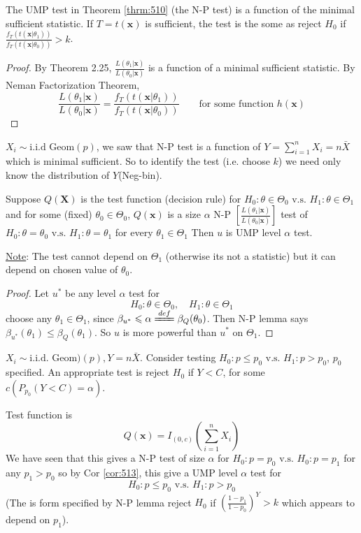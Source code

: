 \documentclass[english, 11pt]{article}
\begin{document}
\begin{cor}\label{cor:512}
The UMP test in Theorem \ref{thrm:510} (the N-P test) is a function of the minimal sufficient statistic. If $T=t(\bm{x})$ is sufficient, the test is the some as reject $H_0$ if $\frac{f_T(t(\bm{x}|\theta_1))}{f_T(t(\bm{x}|\theta_0))}>k$.
\end{cor}
\begin{proof}
By Theorem 2.25, $\frac{L(\theta_1|\bm{x})}{L(\theta_0|\bm{x})}$ is a function of a minimal sufficient statistic. By Neman Factorization Theorem,
$$
\frac{L(\theta_1|\bm{x})}{L(\theta_0|\bm{x})}=\frac{f_T(t(\bm{x}|\theta_1))}{f_T(t(\bm{x}|\theta_0))}\qquad\text{for some function $h(\bm{x})$}
$$
\end{proof}


\begin{exmp}
$X_i\sim\text{i.i.d~Geom}(p)$, we saw that N-P test is a function of $Y=\sum_{i=1}^nX_i=n\bar{X}$ which is minimal sufficient. So to identify the test (i.e. choose $k$) we need only know the distribution of $Y$(Neg-bin).
\end{exmp}

\begin{cor}\label{cor:513}
Suppose $Q(\bm{X})$ is the test function (decision rule) for $H_0:\theta\in\Theta_0\text{ v.s. }H_1:\theta\in\Theta_1$ and for some (fixed) $\theta_0\in\Theta_0$, $Q(\bm{x})$ is a size $\alpha$ N-P $\left[\frac{L(\theta_1|\bm{x})}{L(\theta_0|\bm{x})}\right]$ test of $H_0:\theta=\theta_0\text{ v.s. }H_1:\theta=\theta_1$ for every $\theta_1\in\Theta_1$ Then $u$ is UMP level $\alpha$ test.
\end{cor}

\underline{Note}: The test cannot depend on $\Theta_1$ (otherwise its not a statistic) but it can depend on chosen value of $\theta_0$.
\begin{proof}
Let $u^*$ be any level $\alpha$ test for 
$$
H_0:\theta\in\Theta_0, \quad H_1:\theta\in\Theta_1
$$
choose any $\theta_1\in\Theta_1$, since $\beta_{u^*}\leqslant \alpha\xlongequal{def}\beta_Q(\theta_0)$. Then N-P lemma says $\beta_{u^*}(\theta_1)\leqslant \beta_Q(\theta_1)$. So $u$ is more powerful than $u^*$ on $\Theta_1$.
\end{proof}
\begin{exmp}
$X_i\sim\text{i.i.d. Geom})(p), Y=n\bar{X}$. Consider testing $H_0:p\leqslant p_0\text{ v.s. }H_1:p>p_0$, $p_0$ specified. An appropriate test is reject $H_0$ if $Y<C$, for some $c(P_{p_0}(Y<C)=\alpha)$.

Test function is 
$$
Q(\bm{x})=I_{(0, c)}\left(\sum_{i=1}^nX_i\right)
$$
We have seen that this gives a N-P test of size $\alpha$ for $H_0:p=p_0\text{ v.s. }H_0:p=p_1$ for any $p_1>p_0$ so by Cor \ref{cor:513}, this give a UMP level $\alpha$ test for
$$
H_0:p\leqslant p_0\text{ v.s. }H_1:p>p_0
$$
(The is form specified by N-P lemma reject $H_0$ if $\left(\frac{1-p_1}{1-p_0}\right)^Y>k$ which appears to depend on $p_1$).
\end{exmp}
\end{document}
